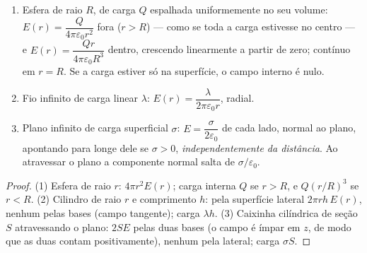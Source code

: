 \begin{proposition}\label{prop:b1:electrostatics-gauss:three}
\begin{enumerate}
  \item Esfera de raio $R$, de carga $Q$ espalhada uniformemente no seu
        volume: $E(r) = \dfrac{Q}{4\pi\varepsilon_0r^2}$ fora ($r > R$) ---
        como se toda a carga estivesse no centro --- e $E(r) =
        \dfrac{Qr}{4\pi\varepsilon_0R^3}$ dentro, crescendo linearmente a partir de zero;
        contínuo em $r = R$. Se a carga estiver só na superfície,
        o campo interno é nulo.
  \item Fio infinito de carga linear $\lambda$: $E(r) =
        \dfrac{\lambda}{2\pi\varepsilon_0 r}$, radial.
  \item Plano infinito de carga superficial $\sigma$: $E = \dfrac{\sigma}{2\varepsilon_0}$
        de cada lado, normal ao plano, apontando para longe dele se
        $\sigma > 0$, \emph{independentemente da distância}. Ao atravessar o plano
        a componente normal salta de $\sigma/\varepsilon_0$.
\end{enumerate}
\end{proposition}

\begin{proof}
(1) Esfera de raio $r$:  $4\pi r^2E(r)$; carga interna $Q$ se
$r > R$, e $Q(r/R)^3$ se $r < R$. (2) Cilindro de raio $r$ e comprimento $h$:
 pela superfície lateral $2\pi rh\,E(r)$, nenhum pelas bases
(campo tangente); carga $\lambda h$. (3) Caixinha cilíndrica de seção $S$
atravessando o plano:  $2SE$ pelas duas bases (o campo é ímpar
em $z$, de modo que as duas contam positivamente), nenhum pela lateral; carga
$\sigma S$.
\end{proof}

